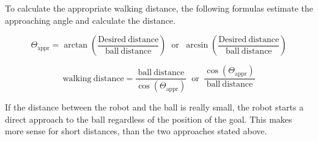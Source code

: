 To calculate the appropriate walking distance, the following formulas estimate the approaching angle and calculate the distance.

\begin{equation}
\Theta_\mathrm{appr}=\arctan\left(\frac{\mathrm{Desired\ distance}}{\mathrm{ball\ distance}} \right) \; \; \mathrm{or} \; \; \arcsin\left(\frac{\mathrm{Desired\ distance}}{\mathrm{ball\ distance}}\right)
\end{equation}

\begin{equation}
	\mathrm{walking\ distance}=\frac{\mathrm{ball\ distance}}{\cos(\Theta_\mathrm{appr})} \; \; \mathrm{or} \; \; \frac{\cos(\Theta_\mathrm{appr})}{\mathrm{ball\ distance}}
\end{equation}

If the distance between the robot and the ball is really small, the robot starts a direct approach to the ball regardless of the position of the goal. This makes more sense for short distances, than the two approaches stated above.
       
